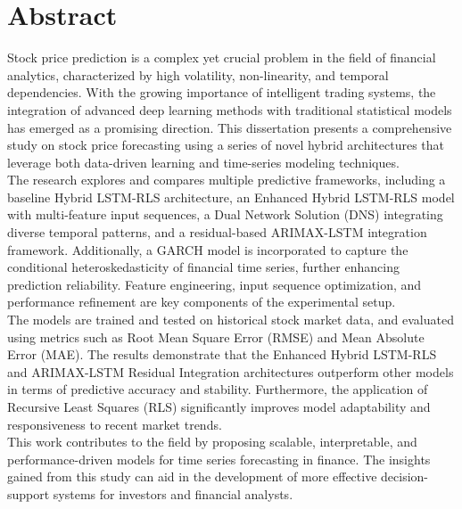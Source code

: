 
\section*{\textbf{Abstract}}

Stock price prediction is a complex yet crucial problem in the field of financial analytics, characterized by high volatility, non-linearity, and temporal dependencies. With the growing importance of intelligent trading systems, the integration of advanced deep learning methods with traditional statistical models has emerged as a promising direction. This dissertation presents a comprehensive study on stock price forecasting using a series of novel hybrid architectures that leverage both data-driven learning and time-series modeling techniques.\\

The research explores and compares multiple predictive frameworks, including a baseline Hybrid LSTM-RLS architecture, an Enhanced Hybrid LSTM-RLS model with multi-feature input sequences, a Dual Network Solution (DNS) integrating diverse temporal patterns, and a residual-based ARIMAX-LSTM integration framework. Additionally, a GARCH model is incorporated to capture the conditional heteroskedasticity of financial time series, further enhancing prediction reliability. Feature engineering, input sequence optimization, and performance refinement are key components of the experimental setup.\\

The models are trained and tested on historical stock market data, and evaluated using metrics such as Root Mean Square Error (RMSE) and Mean Absolute Error (MAE). The results demonstrate that the Enhanced Hybrid LSTM-RLS and ARIMAX-LSTM Residual Integration architectures outperform other models in terms of predictive accuracy and stability. Furthermore, the application of Recursive Least Squares (RLS) significantly improves model adaptability and responsiveness to recent market trends.\\

This work contributes to the field by proposing scalable, interpretable, and performance-driven models for time series forecasting in finance. The insights gained from this study can aid in the development of more effective decision-support systems for investors and financial analysts.\\